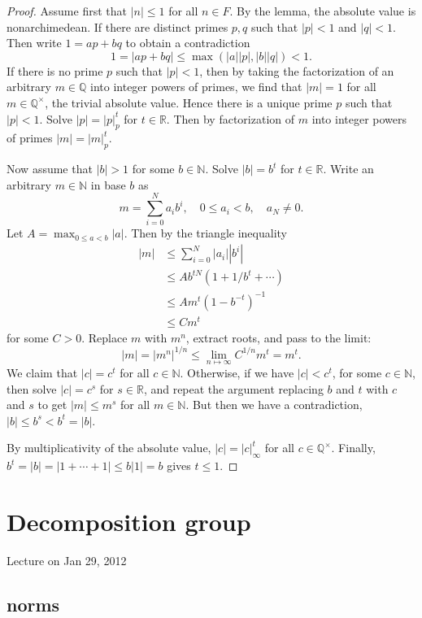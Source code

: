 \documentclass{amsart}
\newcommand{\ring}[1]{\mathbb{#1}}
\def\abs#1{{|#1|}}
\begin{document}
\begin{proof}
Assume first that $\abs{n}\le 1$ for all $n\in F$.  By the lemma, the
absolute value is nonarchimedean.  If there are  distinct primes $p,q$
such that $\abs{p}<1$ and $\abs{q}<1$. Then write $1 = a p + b q$ to obtain
a contradiction
\[
1 = \abs{a p + b q} \le \max(\abs{a}\abs{p},\abs{b}\abs{q}) < 1.
\]
If there is no prime $p$ such that $\abs{p}<1$, then by taking the factorization
of an arbitrary $m\in\ring{Q}$ into integer powers of primes, we find that $\abs{m}=1$
for all $m\in\ring{Q}^\times$, the trivial absolute value.  Hence there is a unique
prime $p$ such that $\abs{p}<1$.  Solve $\abs{p}=\abs{p}_p^t$ for $t\in\ring{R}$.  Then
by factorization of $m$ into integer powers of primes $\abs{m}=\abs{m}_p^t$.

Now assume that $\abs{b}>1$ for some $b\in\ring{N}$.  Solve $\abs{b}=b^t$
for $t\in\ring{R}$.  Write an arbitrary
$m\in\ring{N}$ in base $b$ as
\[
m = \sum_{i=0}^N a_i b^i,\quad 0\le a_i < b,\quad a_N\ne 0.
\] 
Let $A = \max_{0\le a < b} \abs{a}$.
Then by the triangle inequality
\begin{align*}
\abs{m} &\le \sum_{i=0}^N \abs{a_i} \abs{b^i} \\
  &\le A b^{t N} (1+1/b^t+\cdots)\\
  &\le A m^t (1-b^{-t})^{-1}\\
  &\le C m^t
\end{align*}
for some $C>0$.
Replace $m$ with $m^n$,  extract roots, and pass to the limit:
\[
\abs{m}=\abs{m^n}^{1/n}\le \lim_{n\mapsto\infty} C^{1/n} m^t = m^t.
\]
We claim that $\abs{c}=c^t$ for all $c\in\ring{N}$.
Otherwise, if we have $\abs{c} < c^t$, for some $c\in\ring{N}$, then solve $\abs{c}=c^s$
for $s\in\ring{R}$, and repeat the argument replacing $b$ and $t$ with $c$ and $s$
to get $\abs{m} \le m^s$ for all $m\in\ring{N}$.  But then we have a contradiction,
$\abs{b}\le b^s < b^t=\abs{b}$. 

By multiplicativity of the absolute value, $\abs{c}=\abs{c}_\infty^t$ for all
$c\in\ring{Q}^\times$.
Finally, $b^t=\abs{b}=\abs{1+\cdots+1} \le b\abs{1} = b$ gives $t\le 1$.
\end{proof}

\newpage
\section{Decomposition group}

Lecture on Jan 29, 2012

\subsection{norms}
\end{document}
